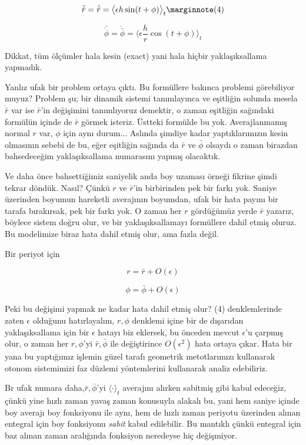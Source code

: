 \documentclass[12pt,fleqn]{article}\usepackage{../../common}
\begin{document}
$$
\bar{\dot{r}} =
\dot{\bar{r}} = \bigl\langle \epsilon h \sin(t + \phi) \bigr\rangle_t
\mlabel{4}
$$

$$
\bar{\dot{\phi}} =
\dot{\bar{\phi}} = \bigl\langle \epsilon \frac{h}{r} \cos(t+\phi)  \bigr\rangle_t
$$

Dikkat, tüm ölçümler  hala kesin (exact) yani hala hiçbir yaklaşıksallama
yapmadık. 

Yanlız ufak bir problem ortaya çıktı. Bu formüllere bakınca problemi görebiliyor
muyuz? Problem şu; bir dinamik sistemi tanımlayınca ve eşitliğin solunda mesela
$\dot{\bar{r}}$ var ise $\bar{r}$'in değişimini tanımlıyoruz demektir, o zaman
eşitliğin sağındaki formülün içinde de $\bar{r}$ görmek isteriz. Üstteki
formülde bu yok. Averajlanmamış normal $r$ var, $\phi$ için aynı
durum... Aslında şimdiye kadar yaptıklarımızın kesin olmasının sebebi de bu,
eğer eşitliğin sağında da $\bar{r}$ ve $\bar{\phi}$ olsaydı o zaman birazdan
bahsedeceğim yaklaşıksallama numarasını yapmış olacaktık.

Ve daha önce bahsettiğimiz saniyelik anda boy uzaması örneği fikrine şimdi
tekrar döndük.  Nasıl? Çünkü $r$ ve $\bar{r}$'in birbirinden pek bir farkı
yok. Saniye üzerinden boyumun hareketli averajının boyumdan, ufak bir hata
payını bir tarafa bırakırsak, pek bir farkı yok. O zaman her $r$ gördüğümüz
yerde $\bar{r}$ yazarız, böylece sistem doğru olur, ve bir yaklaşıksallamayı
formüllere dahil etmiş oluruz. Bu modelimize biraz hata dahil etmiş olur, ama
fazla değil.

Bir periyot için

$$ r = \bar{r} + O(\epsilon) $$

$$ \phi = \bar{\phi} + O(\epsilon) $$

Peki bu değişimi yapmak ne kadar hata dahil etmiş olur? (4) denklemlerinde zaten
$\epsilon$ olduğunu hatırlayalım, $r,\phi$ denklemi içine bir de dışarıdan
yaklaşıksallama için bir $\epsilon$ hatayı biz eklersek, bu önceden mevcut
$\epsilon$'u çarpmış olur, o zaman her $r,\phi$'yi $\bar{r},\bar{\phi}$ ile
değiştirince $O(\epsilon^2)$ hata ortaya çıkar. Hata bir yana bu yaptığımız
işlemin güzel tarafı geometrik metotlarımızı kullanarak otonom sistemimizi faz
düzlemi yöntemlerini kullanarak analiz edebiliriz.

Br ufak numara daha,$\bar{r},\bar{\phi}$'yi $\langle \cdot \rangle_t$ averajını
alırken sabitmiş gibi kabul edeceğiz, çünkü yine hızlı zaman yavaş zaman
konusuyla alakalı bu, yani hem saniye içinde boy averajı boy fonksiyonu ile
aynı, hem de hızlı zaman periyotu üzerinden alınan entegral için boy fonksiyonu
{\em sabit} kabul edilebilir. Bu mantıklı çünkü entegral için baz alınan zaman
aralığında fonksiyon neredeyse hiç değişmiyor. 
\end{document}
